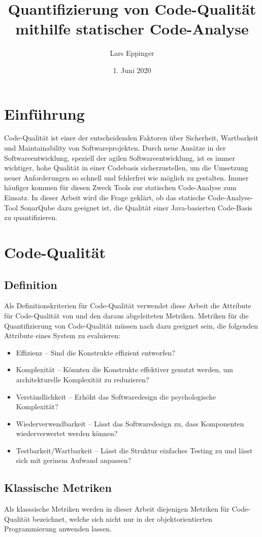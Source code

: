 \documentclass[a4paper, 12pt]{article}
\author{Lars Eppinger}
\title{Quantifizierung von Code-Qualität mithilfe statischer Code-Analyse}
\date{1. Juni 2020}
\begin{document}

\tableofcontents
\newpage

\section{Einführung}
Code-Qualität ist einer der entscheidenden Faktoren über Sicherheit, Wartbarkeit und Maintainability von Softwareprojekten. 
Durch neue Ansätze in der Softwareentwicklung, speziell der agilen Softwareentwicklung, ist es immer wichtiger, hohe Qualität in einer Codebasis sicherzustellen, um die Umsetzung neuer Anforderungen so schnell und fehlerfrei wie möglich zu gestalten.
Immer häufiger kommen für diesen Zweck Tools zur statischen Code-Analyse zum Einsatz.
In dieser Arbeit wird die Frage geklärt, ob das statische Code-Analyse-Tool SonarQube dazu geeignet ist, die Qualität einer Java-basierten Code-Basis zu quantifizieren.

\section{Code-Qualität}
\subsection{Definition}
Als Definitionskriterien für Code-Qualität verwendet diese Arbeit die Attribute für Code-Qualität von \textcite{Linda_softwarequality} und den daraus abgeleiteten Metriken.
Metriken für die Quantifizierung von Code-Qualität müssen nach \textcite{Linda_softwarequality} dazu geeignet sein, die folgenden Attribute eines System zu evaluieren:
\begin{itemize}
    \item Effizienz -- Sind die Konstrukte effizient entworfen?
    \item Komplexität -- Könnten die Konstrukte effektiver genutzt werden, um architekturelle Komplexität zu reduzieren?
    \item Verständlichkeit -- Erhöht das Softwaredesign die psychologische Komplexität?
    \item Wiederverwendbarkeit -- Lässt das Softwaredesign zu, dass Komponenten wiederverwertet werden können?
    \item Testbarkeit/Wartbarkeit -- Lässt die Struktur einfaches Testing zu und lässt sich mit gerinem Aufwand anpassen?
\end{itemize}

\subsection{Klassische Metriken}
Als klasssische Metriken werden in dieser Arbeit diejenigen Metriken für Code-Qualität bezeichnet, welche sich nicht nur in der objektorientierten Programmierung anwenden lassen.
\end{document}
